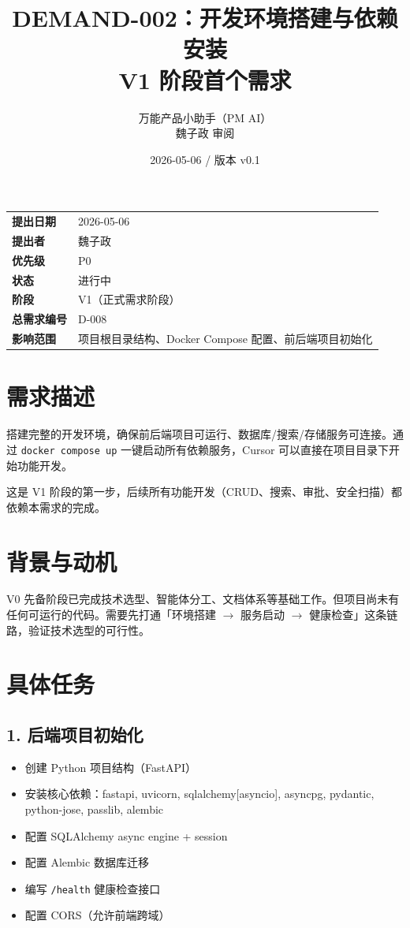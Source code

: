 \documentclass[11pt,a4paper]{article}
\title{\textbf{DEMAND-002：开发环境搭建与依赖安装}\\[0.5em]\small V1 阶段首个需求}
\author{万能产品小助手（PM AI）\\魏子政 审阅}
\date{2026-05-06 / 版本 v0.1}
\begin{document}
\maketitle

\begin{center}
\begin{tabular}{>{\bfseries}p{3cm} p{10cm}}
\toprule
提出日期 & 2026-05-06 \\
提出者 & 魏子政 \\
优先级 & \textcolor{danger}{P0} \\
状态 & \textcolor{progress}{进行中} \\
阶段 & V1（正式需求阶段） \\
总需求编号 & D-008 \\
影响范围 & 项目根目录结构、Docker Compose 配置、前后端项目初始化 \\
\bottomrule
\end{tabular}
\end{center}

\vspace{1em}

\section{需求描述}

搭建完整的开发环境，确保前后端项目可运行、数据库/搜索/存储服务可连接。通过 \texttt{docker compose up} 一键启动所有依赖服务，Cursor 可以直接在项目目录下开始功能开发。

这是 V1 阶段的第一步，后续所有功能开发（CRUD、搜索、审批、安全扫描）都依赖本需求的完成。

\section{背景与动机}

V0 先备阶段已完成技术选型、智能体分工、文档体系等基础工作。但项目尚未有任何可运行的代码。需要先打通「环境搭建 $\to$ 服务启动 $\to$ 健康检查」这条链路，验证技术选型的可行性。

\section{具体任务}

\subsection{1. 后端项目初始化}

\begin{itemize}[nosep]
  \item 创建 Python 项目结构（FastAPI）
  \item 安装核心依赖：fastapi, uvicorn, sqlalchemy[asyncio], asyncpg, pydantic, python-jose, passlib, alembic
  \item 配置 SQLAlchemy async engine + session
  \item 配置 Alembic 数据库迁移
  \item 编写 \texttt{/health} 健康检查接口
  \item 配置 CORS（允许前端跨域）
\end{itemize}
\end{document}
